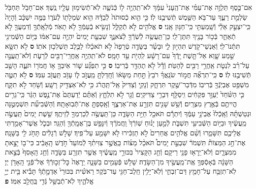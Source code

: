 \documentclass[twoside, openany, parskip=half, 11pt]{book}
\begin{document}
\begin{footnotesize}
\begin{multicols}{2}
\\
\\
אִם־כֶּ֣סֶף תַּלְוֶ֣ה אֶת־עַמִּ֗י אֶת־הֶֽעָנִי֙ עִמָּ֔ךְ לֹא־תִֽהְיֶ֥ה ל֖וֹ כְּֿנֹשֶׁ֑ה לֹֽא־תְֿשִׂימ֥וּן עָלָ֖יו נֶֽשֶׁךְ׃ אִם־חָבֹ֥ל תַּחְבֹּ֖ל שַׂלְמַ֣ת רֵעֶ֑ךָ עַד־בֹּ֥א הַשֶּׁ֖מֶשׁ תְּֿשִׁיבֶ֥נּוּ לֽוֹ׃ כִּ֣י הִ֤וא כְֿסוּתֹה֙ לְֿבַדָּ֔הּ הִ֥וא שִׂמְלָת֖וֹ לְֿעֹר֑וֹ בַּמֶּ֣ה יִשְׁכָּ֔ב וְֿהָיָה֙ כִּֽי־יִצְעַ֣ק אֵלַ֔י וְֿשָֽׁמַעְתִּ֖י כִּֽי־חַנּ֥וּן אָֽנִי׃ \textbf{ס}
אֱלֹהִ֖ים לֹ֣א תְֿקַלֵּ֑ל וְֿנָשִׂ֥יא בְֿעַמְּֿךָ֖ לֹ֥א תָאֹֽר׃ מְֿלֵאָֽתְֿךָ֥ וְֿדִמְעֲךָ֖ לֹ֣א תְֿאַחֵ֑ר בְּֿכ֥וֹר בָּנֶ֖יךָ תִּתֶּן־לִֽי׃ כֵּן־תַּֽעֲשֶׂ֥ה לְֿשֹֽׁרְֿךָ֖ לְֿצֹאנֶ֑ךָ שִׁבְעַ֤ת יָמִים֙ יִהְיֶ֣ה עִם־אִמּ֔וֹ בַּיּ֥וֹם הַשְּֿׁמִינִ֖י תִּתְּֿנוֹ־לִֽי׃ וְֿאַנְשֵׁי־קֹ֖דֶשׁ תִּהְי֣וּן לִ֑י וּבָשָׂ֨ר בַּשָּׂדֶ֤ה טְֿרֵפָה֙ לֹ֣א תֹאכֵ֔לוּ לַכֶּ֖לֶב תַּשְׁלִכ֥וּן אֹתֽוֹ׃ \textbf{ס} לֹ֥א תִשָּׂ֖א שֵׁ֣מַע שָׁ֑וְא אַל־תָּ֤שֶׁת יָֽדְֿךָ֙ עִם־רָשָׁ֔ע לִֽהְיֹ֖ת עֵ֥ד חָמָֽס׃ לֹא־תִֽהְיֶ֥ה אַֽחֲרֵֽי־רַבִּ֖ים לְֿרָעֹ֑ת וְֿלֹא־תַֽעֲנֶ֣ה עַל־רִ֗ב לִנְטֹ֛ת אַֽחֲרֵ֥י רַבִּ֖ים לְֿהַטֹּֽת׃ וְֿדָ֕ל לֹ֥א תֶהְדַּ֖ר בְּֿרִיבֽוֹ׃ \textbf{ס} כִּ֣י תִפְגַּ֞ע שׁ֧וֹר אֹֽיִבְךָ֛ א֥וֹ חֲמֹר֖וֹ תֹּעֶ֑ה הָשֵׁ֥ב תְּֿשִׁיבֶ֖נּוּ לֽוֹ׃ \textbf{ס} כִּֽי־תִרְאֶ֞ה חֲמ֣וֹר שֹׂנַֽאֲךָ֗ רֹבֵץ֙ תַּ֣חַת מַשָּׂא֔וֹ וְֿחָֽדַלְתָּ֖ מֵֽעֲזֹ֣ב ל֑וֹ עָזֹ֥ב תַּֽעֲזֹ֖ב עִמּֽוֹ׃ \textbf{ס}
לֹ֥א תַטֶּ֛ה מִשְׁפַּ֥ט אֶבְיֹֽנְֿךָ֖ בְּֿרִיבֽוֹ׃ מִדְּֿבַר־שֶׁ֖קֶר תִּרְחָ֑ק וְֿנָקִ֤י וְֿצַדִּיק֙ אַֽל־תַּֽהֲרֹ֔ג כִּ֥י לֹֽא־אַצְדִּ֖יק רָשָֽׁע׃ וְֿשֹׁ֖חַד לֹ֣א תִקָּ֑ח כִּ֤י הַשֹּׁ֨חַד֙ יְֿעַוֵּ֣ר פִּקְחִ֔ים וִֽיסַלֵּ֖ף דִּבְרֵ֥י צַדִּיקִֽים׃ וְֿגֵ֖ר לֹ֣א תִלְחָ֑ץ וְֿאַתֶּ֗ם יְֿדַעְתֶּם֙ אֶת־נֶ֣פֶשׁ הַגֵּ֔ר כִּֽי־גֵרִ֥ים הֱיִיתֶ֖ם בְּֿאֶ֥רֶץ מִצְרָֽיִם׃ וְֿשֵׁ֥שׁ שָׁנִ֖ים תִּזְרַ֣ע אֶת־אַרְצֶ֑ךָ וְֿאָֽסַפְתָּ֖ אֶת־תְּֿבֽוּאָתָֽהּ׃ וְֿהַשְּֿׁבִיעִ֞ת תִּשְׁמְטֶ֣נָּה וּנְטַשְׁתָּ֗הּ וְֿאָֽכְֿלוּ֙ אֶבְיֹנֵ֣י עַמֶּ֔ךָ וְֿיִתְרָ֕ם תֹּאכַ֖ל חַיַּ֣ת הַשָּׂדֶ֑ה כֵּן־תַּֽעֲשֶׂ֥ה לְֿכַרְמְךָ֖ לְֿזֵיתֶֽךָ׃ שֵׁ֤שֶׁת יָמִים֙ תַּֽעֲשֶׂ֣ה מַֽעֲשֶׂ֔יךָ וּבַיּ֥וֹם הַשְּֿׁבִיעִ֖י תִּשְׁבֹּ֑ת לְֿמַ֣עַן יָנ֗וּחַ שֽׁוֹרְֿךָ֙ וַֽחֲמֹרֶ֔ךָ וְֿיִנָּפֵ֥שׁ בֶּן־אֲמָֽתְֿךָ֖ וְֿהַגֵּֽר׃ וּבְכֹ֛ל אֲשֶׁר־אָמַ֥רְתִּי אֲלֵיכֶ֖ם תִּשָּׁמֵ֑רוּ וְֿשֵׁ֨ם אֱלֹהִ֤ים אֲחֵרִים֙ לֹ֣א תַזְכִּ֔ירוּ לֹ֥א יִשָּׁמַ֖ע עַל־פִּֽיךָ׃ שָׁלֹ֣שׁ רְֿגָלִ֔ים תָּחֹ֥ג לִ֖י בַּשָּׁנָֽה׃ אֶת־חַ֣ג הַמַּצּוֹת֘ תִּשְׁמֹר֒ שִׁבְעַ֣ת יָמִים֩ תֹּאכַ֨ל מַצּ֜וֹת כַּֽאֲשֶׁ֣ר צִוִּיתִ֗ךָ לְֿמוֹעֵד֙ חֹ֣דֶשׁ הָֽאָבִ֔יב כִּי־ב֖וֹ יָצָ֣אתָ מִמִּצְרָ֑יִם וְֿלֹא־יֵֽרָא֥וּ פָנַ֖י רֵיקָֽם׃ וְֿחַ֤ג הַקָּצִיר֙ בִּכּוּרֵ֣י מַֽעֲשֶׂ֔יךָ אֲשֶׁ֥ר תִּזְרַ֖ע בַּשָּׂדֶ֑ה וְֿחַ֤ג הָֽאָסִף֙ בְּֿצֵ֣את הַשָּׁנָ֔ה בְּֿאָסְֿפְּךָ֥ אֶֽת־מַֽעֲשֶׂ֖יךָ מִן־הַשָּׂדֶֽה׃ שָׁלֹ֥שׁ פְּֿעָמִ֖ים בַּשָּׁנָ֑ה יֵֽרָאֶה֙ כׇּל־זְכ֣וּרְֿךָ֔ אֶל־פְּֿנֵ֖י הָֽאָדֹ֥ן יְיָ׃ לֹֽא־תִזְבַּ֥ח עַל־חָמֵ֖ץ דַּם־זִבְחִ֑י וְֿלֹֽא־יָלִ֥ין חֵֽלֶב־חַגִּ֖י עַד־בֹּֽקֶר׃ רֵאשִׁ֗ית בִּכּוּרֵי֙ אַדְמָ֣תְֿךָ֔ תָּבִ֕יא בֵּ֖ית יְיָ֣ אֱלֹהֶ֑יךָ לֹֽא־תְֿבַשֵּׁ֥ל גְּֿדִ֖י בַּֽחֲלֵ֥ב אִמּֽוֹ׃ \textbf{פ}


\end{multicols}
\end{footnotesize}
\end{document}
